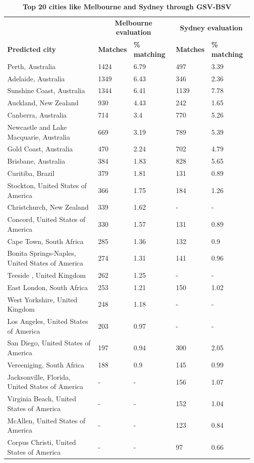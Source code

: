 \documentclass[10pt,letterpaper,hidelinks]{article}
\begin{document}
\begin{table}[!htbp]
\begin{adjustwidth}{-2.25in}{0in}
\caption{\bf Top 20 cities like Melbourne and Sydney through GSV-BSV \label{tab:melbournesydneyGSV}}     
\begin{tabular}{ l  l l l  l}
 \hline    &  \multicolumn{2}{c}{\textbf{Melbourne evaluation}} & \multicolumn{2}{c}{\textbf{Sydney evaluation}}  \\  
\textbf{Predicted city} & \textbf{Matches} & \textbf{\% matching}  & \textbf{Matches} & \textbf{\% matching}\\ \hline
Perth, Australia & 1424 & 6.79 & 497 & 3.39 \\ 
Adelaide, Australia & 1349 & 6.43 & 346 & 2.36 \\ 
Sunshine Coast, Australia & 1344 & 6.41 & 1139 & 7.78 \\ 
Auckland, New Zealand & 930 & 4.43 & 242 & 1.65 \\ 
Canberra, Australia & 714 & 3.4 & 770 & 5.26 \\ 
Newcastle and Lake Macquarie, Australia & 669 & 3.19 & 789 & 5.39 \\ 
Gold Coast, Australia & 470 & 2.24 & 702 & 4.79 \\ 
Brisbane, Australia & 384 & 1.83 & 828 & 5.65 \\ 
Curitiba, Brazil & 379 & 1.81 & 131 & 0.89 \\ 
Stockton, United States of America & 366 & 1.75 & 184 & 1.26 \\ 
Christchurch, New Zealand & 339 & 1.62 &-&- \\ 
Concord, United States of America & 330 & 1.57 & 131 & 0.89 \\ 
Cape Town, South Africa & 285 & 1.36 & 132 & 0.9 \\ 
Bonita Springs-Naples, United States of America & 274 & 1.31 & 141 & 0.96 \\ 
Teeside , United Kingdom & 262 & 1.25 &-&- \\ 
East London, South Africa & 253 & 1.21 & 150 & 1.02 \\ 
West Yorkshire, United Kingdom & 248 & 1.18 &-&- \\ 
Los Angeles, United States of America & 203 & 0.97 &-&- \\ 
San Diego, United States of America & 197 & 0.94 & 300 & 2.05 \\ 
Vereeniging, South Africa & 188 & 0.9 & 145 & 0.99 \\ 
Jacksonville, Florida, United States of America  &-&- & 156 & 1.07\\ 
Virginia Beach, United States of America  &-&- & 152 & 1.04\\ 
McAllen, United States of America&-&- & 123 & 0.84\\ 
Corpus Christi, United States of America&-&- & 97 & 0.66\\ \hline
\end{tabular}
\end{adjustwidth}
\end{table}
\end{document}
